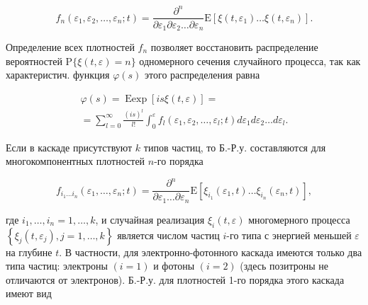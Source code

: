 \documentclass[10pt]{article}
\begin{document}
\[

f_{n}\left(\varepsilon_{1}, \varepsilon_{2}, \ldots, \varepsilon_{n} ; t\right)=\frac{\partial^{n}}{\partial \varepsilon_{1} \partial \varepsilon_{2} \ldots \partial \varepsilon_{n}} \mathrm{E}\left[\xi\left(t, \varepsilon_{1}\right) \ldots \xi\left(t, \varepsilon_{n}\right)\right] .

\]



Определение всех плотностей $f_{n}$ позволяет восстановить распределение вероятностей $\mathrm{P}\{\xi(t, \varepsilon)=n\}$ одномерного сечения случайного процесса, так как характеристич. функция $\varphi(s)$ этого распределения равна



\[

\begin{gathered}

\varphi(s)=\operatorname{Eexp}[i s \xi(t, \varepsilon)]= \\

=\sum_{l=0}^{\infty} \frac{(i s)^{l}}{l !} \int_{0}^{\varepsilon} f_{l}\left(\varepsilon_{1}, \varepsilon_{2}, \ldots, \varepsilon_{l} ; t\right) d \varepsilon_{1} d \varepsilon_{2} \ldots d \varepsilon_{l} .

\end{gathered}

\]



Если в каскаде присутствуют $k$ типов частиц, то Б.-Р.у. составляются для многокомпонентных плотностей $n$-го порядка



\[

f_{i_{1} \ldots i_{n}}\left(\varepsilon_{1}, \ldots, \varepsilon_{n} ; t\right)=\frac{\partial^{n}}{\partial \varepsilon_{1} \ldots \partial \varepsilon_{n}} \mathrm{E}\left[\xi_{i_{1}}\left(\varepsilon_{1}, t\right) \ldots \xi_{i_{n}}\left(\varepsilon_{n}, t\right)\right],

\]



где $i_{1}, \ldots, i_{n}=1, \ldots, k$, и случайная реализация $\xi_{i}(t, \varepsilon)$ многомерного процесса $\left\{\xi_{j}\left(t, \varepsilon_{j}\right), j=1, \ldots, k\right\}$ является числом частиц $i$-го типа с энергией меньшей $\varepsilon$ на глубине $t$. В частности, для электронно-фотонного каскада имеются только два типа частиц: электроны $(i=1)$ и фотоны $(i=2)$ (здесь позитроны не отличаются от электронов). Б.-Р.у. для плотностей 1-го порядка этого каскада имеют вид
\end{document}
